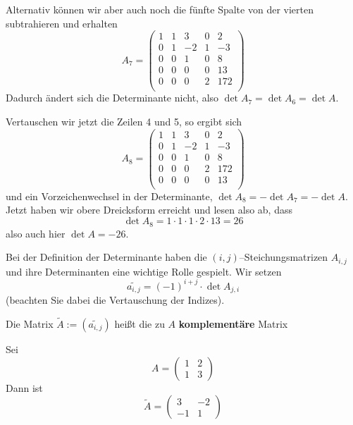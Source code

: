 \begin{beispiel}
Alternativ können wir aber auch noch die fünfte Spalte von der vierten subtrahieren und erhalten
  	$$ A_7 = \left( \begin{matrix} 1 & 1 & 3 & 0 & 2 \\ 0 & 1 & -2 & 1 & -3\\  0 & 0 & 1 & 0 & 8 \\
  	0 & 0 & 0 & 0 & 13 \\ 0 & 0 & 0 & 2 & 172 \\   \end{matrix} 
   	\right) $$
Dadurch ändert sich die  Determinante nicht, also $\det{A_7} = \det{A_6} = \det{A}$.

Vertauschen wir jetzt die Zeilen 4 und 5, so ergibt sich  
  	$$ A_8 = \left( \begin{matrix} 1 & 1 & 3 & 0 & 2 \\ 0 & 1 & -2 & 1 & -3\\  0 & 0 & 1 & 0 & 8 \\
   	0 & 0 & 0 & 2 & 172 \\ 0 & 0 & 0 & 0 & 13 \\   \end{matrix} \right) $$
und ein Vorzeichenwechsel in der Determinante, $\det{A_8}= -\det{A_7} = -\det{A}$.
Jetzt haben wir obere Dreicksform erreicht und lesen also ab, dass
  	$$ \det{A_8} = 1 \cdot 1 \cdot 1 \cdot 2 \cdot 13 = 26 $$
also auch hier $\det{A}= -26$.
\end{beispiel}

\bigbreak

Bei der Definition der Determinante haben die $(i,j)$--Steichungsmatrizen $A_{i,j}$ 
und ihre Determinanten eine wichtige Rolle gespielt. Wir setzen 
  	$$ \widetilde{a_{i,j}} = (-1)^{i+j} \cdot \det{A_{j,i}} $$
(beachten Sie dabei die Vertauschung der Indizes).

\begin{definition} Die Matrix $\widetilde{A} := \left( \widetilde{a_{i,j}} \right)$ 
heißt die zu $A$ \textbf{komplementäre} Matrix
\end{definition}

\begin{beispiel}\label{det_kompl_2} Sei 
  	$$ A = \left( \begin{matrix} 1 & 2 \\ 1 & 3 \end{matrix} \right) $$
Dann ist 
  	$$ \widetilde{A} = \left( \begin{matrix} 3 & -2 \\ -1 & 1 \end{matrix} \right) $$
\end{beispiel}

